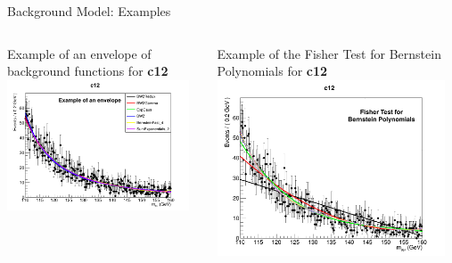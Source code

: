 \documentclass[pdf, 9pt]{beamer}
\begin{document}
  \begin{frame}[c]{Background Model: Examples}
    \vspace{-0.7cm}
    \begin{columns}[T]
      \begin{column}{0.5\textwidth}
        \begin{center}
        Example of an envelope of background functions for \textbf{c12}\\
        \includegraphics[width=0.95\textwidth, height=0.5\textheight]{figs/higgs/backgroundmodel/uf_bdt/backgroundFits__c12__bkgModels.png}
        \end{center}
      \end{column}
      \begin{column}{0.5\textwidth}
        \begin{center}
        Example of the Fisher Test for Bernstein Polynomials for \textbf{c12}\\
        \includegraphics[width=0.95\textwidth, height=0.5\textheight]{figs/higgs/ftest/uf/ftest__c12__bernsteinFastModels.png}
        \end{center}
      \end{column}
    \end{columns}
  \end{frame}
\end{document}
